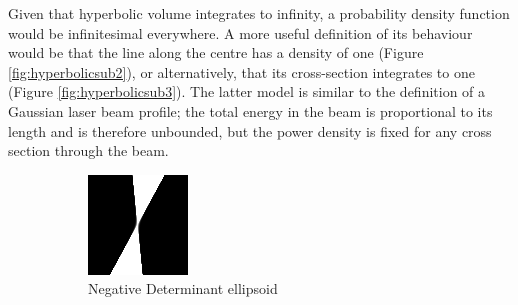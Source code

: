 \documentclass[a4paper, 11pt, titlepage]{article}
\begin{document}
        Given that hyperbolic volume integrates to infinity, a probability density function would be infinitesimal everywhere.  A more useful definition of its behaviour would be that the line along the centre has a density of one (Figure \ref{fig:hyperbolicsub2}), or alternatively, that its cross-section integrates to one (Figure \ref{fig:hyperbolicsub3}).
        The latter model is similar to the definition of a Gaussian laser beam profile; the total energy in the beam is proportional to its length and is therefore unbounded, but the power density is fixed for any cross section through the beam.
        \begin{figure}
        \centering
        \begin{subfigure}{.33\textwidth}
          \centering
          \includegraphics[width=.9\linewidth]{images/GaussianRay1.png}
          \caption{Negative Determinant ellipsoid}
          \label{fig:hyperbolicsub1}
        \end{subfigure}%
        \begin{subfigure}{.33\textwidth}
          \centering

\end{subfigure}
\end{figure}
\end{document}
